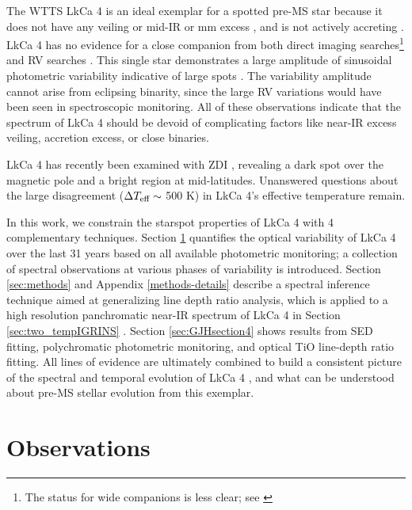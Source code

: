 \documentclass[12pt]{report}
\newcommand{\name}{LkCa 4 }
\begin{document}
The WTTS \name \citep{herbig86,strom89a,downes88,strom89b} is an ideal exemplar for a spotted pre-MS star because it does not have any veiling \citep[\emph{e.g.}][]{hartigan95} or mid-IR or mm excess \citep[\emph{e.g.}][]{andrews05,furlan06,buckle15}, and is not actively accreting \citep[\emph{e.g.}][]{edwards06,cauley12}.  LkCa 4 has no evidence for a close companion from both direct imaging searches\citep{karr10,kraus11,daemgen15}\footnote{The status for wide companions is less clear; see \citet{stauffer91,itoh08,kraus09,kraus11,herczeg14}} and RV searches \citep{nguyen12,donati14}.  This single star demonstrates a large amplitude of sinusoidal photometric variability indicative of large spots \citep{grankin08,xiao12}.  The variability amplitude cannot arise from eclipsing binarity, since the large RV variations would have been seen in spectroscopic monitoring.  All of these observations indicate that the spectrum of \name should be devoid of complicating factors like near-IR excess veiling, accretion excess, or close binaries.    

LkCa 4 has recently been examined with ZDI \citep{donati14}, revealing a dark spot over the magnetic pole and a bright region at mid-latitudes.  Unanswered questions about the large disagreement ($\Delta T_\textrm{eff} \sim$ 500 K) in LkCa 4's effective temperature \citep{herczeg14, donati14} remain.

In this work, we constrain the starspot properties of \name with 4 complementary techniques.  Section \ref{sec:obs} quantifies the optical variability of \name over the last 31 years based on all available photometric monitoring; a collection of spectral observations at various phases of variability is introduced.  Section \ref{sec:methods} and Appendix \ref{methods-details} describe a spectral inference technique aimed at generalizing line depth ratio analysis, which is applied to a high resolution panchromatic near-IR spectrum of \name in Section \ref{sec:two_tempIGRINS} .  Section \ref{sec:GJHsection4} shows results from SED fitting, polychromatic photometric monitoring, and optical TiO line-depth ratio fitting.  All lines of evidence are ultimately combined to build a consistent picture of the spectral and temporal evolution of \name, and what can be understood about pre-MS stellar evolution from this exemplar.


\section{Observations}\label{sec:obs} 
\end{document}
